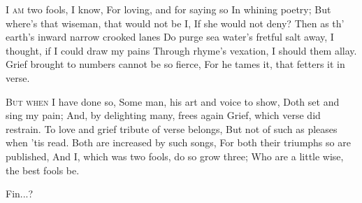 \documentclass[fontsize=9, a5paper]{scrbook}
\begin{document}
\begin{poem}

	\begin{stanza}
		\textsc{I am} two fools, I know,\verseline
		      \verseindent For loving, and for saying so\verseline
		         \verseindent\verseindent  In whining poetry;\verseline
		But where's that wiseman, that would not be I,\verseline
		          \verseindent If she would not deny?\verseline
		Then as th' earth's inward narrow crooked lanes\verseline
		    \verseindent Do purge sea water's fretful salt away,\verseline
		I thought, if I could draw my pains\verseline
		    \verseindent Through rhyme's vexation, I should them allay.\verseline
		Grief brought to numbers cannot be so fierce,\verseline
		For he tames it, that fetters it in verse.
	\end{stanza}
	
	\begin{stanza}
		      \verseindent \textsc{But when} I have done so,\verseline
		      \verseindent Some man, his art and voice to show,\verseline
		          \verseindent\verseindent Doth set and sing my pain;\verseline
		And, by delighting many, frees again\verseline
		          \verseindent Grief, which verse did restrain.\verseline
		To love and grief tribute of verse belongs,\verseline
		    \verseindent But not of such as pleases when 'tis read.\verseline
		Both are increased by such songs,\verseline
		    \verseindent For both their triumphs so are published,\verseline
		And I, which was two fools, do so grow three;\verseline
		Who are a little wise, the best fools be. 
	\end{stanza}
\end{poem}

\pagebreak


\begin{volumetitlepage}

\huge{Fin...?}

\end{volumetitlepage}
\end{document}
